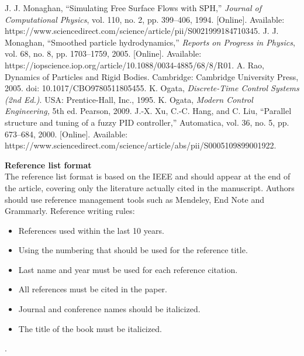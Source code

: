 \documentclass{article}
\begin{document}
\begin{thebibliography}{1.7}
	 \color{cyan}J. J. Monaghan, “Simulating Free Surface Flows with SPH,” \textit{Journal of Computational Physics}, vol. 110, no. 2, pp. 399–406, 1994. [Online]. Available: https://www.sciencedirect.com/science/article/pii/S0021999184710345.\color{black}
	 \color{cyan}J. J. Monaghan, “Smoothed particle hydrodynamics,” \textit{Reports on Progress in Physics}, vol. 68, no. 8, pp. 1703–1759, 2005. [Online]. Available: https://iopscience.iop.org/article/10.1088/0034-4885/68/8/R01.\color{black}
	 \color{cyan}A. Rao, Dynamics of Particles and Rigid Bodies. Cambridge: Cambridge University Press, 2005. doi: 10.1017/CBO9780511805455.\color{black}
	 \color{cyan}K. Ogata, \textit{Discrete-Time Control Systems (2nd Ed.)}. USA: Prentice-Hall, Inc., 1995.\color{black}
	 \color{cyan}K. Ogata, \textit{Modern Control Engineering,} 5th ed. Pearson, 2009.\color{black}
	 \color{cyan}J.-X. Xu, C.-C. Hang, and C. Liu, “Parallel structure and tuning of a fuzzy PID controller,” Automatica, vol. 36, no. 5, pp. 673–684, 2000. [Online]. Available: https://www.sciencedirect.com/science/article/abs/pii/S0005109899001922.\color{black}
	
\end{thebibliography}
\textbf{Reference list format}\\
The reference list format is based on the IEEE and should appear at the end of the article, covering only the literature actually cited in the manuscript. Authors should use reference management tools such as Mendeley, End Note and Grammarly. Reference writing rules:
\begin{itemize}
	\item  References used within the last 10 years.
	\item Using the numbering that should be used for the reference title.
	\item Last name and year must be used for each reference citation.
	\item All references must be cited in the paper.
	\item Journal and conference names should be italicized.
	\item  The title of the book must be italicized.
\end{itemize}
.
\end{document}
